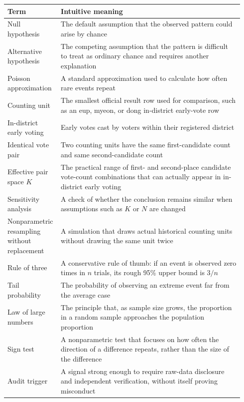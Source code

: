 \documentclass[preprint]{../ieie/IEIE}
\begin{document}
\begin{center}
\small
\begin{tabular}{>{\raggedright\arraybackslash}p{0.18\linewidth}>{\raggedright\arraybackslash}p{0.76\linewidth}}
\toprule
Term & Intuitive meaning \\
\midrule
Null hypothesis & The default assumption that the observed pattern could arise by chance \\
Alternative hypothesis & The competing assumption that the pattern is difficult to treat as ordinary chance and requires another explanation \\
Poisson approximation & A standard approximation used to calculate how often rare events repeat \\
Counting unit & The smallest official result row used for comparison, such as an eup, myeon, or dong in-district early-vote row \\
In-district early voting & Early votes cast by voters within their registered district \\
Identical vote pair & Two counting units have the same first-candidate count and same second-candidate count \\
Effective pair space \(K\) & The practical range of first- and second-place candidate vote-count combinations that can actually appear in in-district early voting \\
Sensitivity analysis & A check of whether the conclusion remains similar when assumptions such as \(K\) or \(N\) are changed \\
Nonparametric resampling without replacement & A simulation that draws actual historical counting units without drawing the same unit twice \\
Rule of three & A conservative rule of thumb: if an event is observed zero times in \(n\) trials, its rough 95\% upper bound is \(3/n\) \\
Tail probability & The probability of observing an extreme event far from the average case \\
Law of large numbers & The principle that, as sample size grows, the proportion in a random sample approaches the population proportion \\
Sign test & A nonparametric test that focuses on how often the direction of a difference repeats, rather than the size of the difference \\
Audit trigger & A signal strong enough to require raw-data disclosure and independent verification, without itself proving misconduct \\
\bottomrule
\end{tabular}
\end{center}
\end{document}
